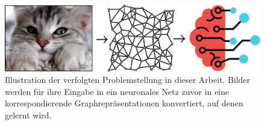 \begin{figure}[t]
\centering
\includegraphics[width=\textwidth]{bilder/problemstellung.png}
\caption[Problemstellung]{Illustration der verfolgten Problemstellung in dieser Arbeit.
Bilder werden für ihre Eingabe in ein neuronales Netz zuvor in eine korrespondierende Graphrepräsentationen konvertiert, auf denen gelernt wird.}
\label{fig:problemstellung}
\end{figure}
